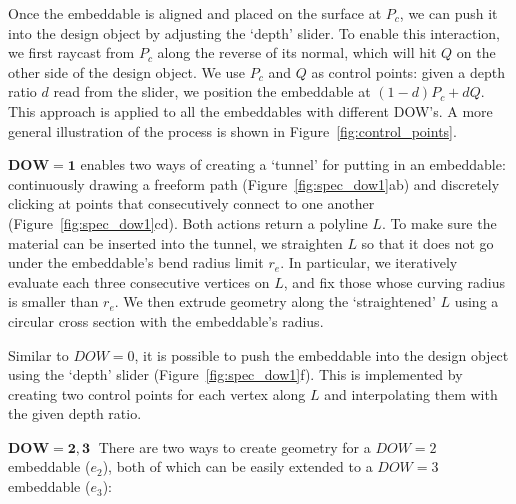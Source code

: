 Once the embeddable is aligned and placed on the surface at $P_c$, we can push it into the design object by adjusting the `depth' slider. To enable this interaction, we first raycast from $P_c$ along the reverse of its normal, which will hit $Q$ on the other side of the design object. We use $P_c$ and $Q$ as control points: given a depth ratio $d$ read from the slider, we position the embeddable at $(1-d)P_c + dQ$. This approach is applied to all the embeddables with different DOW's. A more general illustration of the process is shown in Figure~\ref{fig:control_points}.

$\mathbf{DOW=1}$ enables two ways of creating a `tunnel' for putting in an embeddable: continuously drawing a freeform path (Figure~\ref{fig:spec_dow1}ab) and discretely clicking at points that consecutively connect to one another (Figure~\ref{fig:spec_dow1}cd). Both actions return a polyline $L$. To make sure the material can be inserted into the tunnel, we straighten $L$ so that it does not go under the embeddable's bend radius limit $r_e$. In particular, we iteratively evaluate each three consecutive vertices on $L$, and fix those whose curving radius is smaller than $r_e$. We then extrude geometry along the `straightened' $L$ using a circular cross section with the embeddable's radius.

Similar to $DOW=0$, it is possible to push the embeddable into the design object using the `depth' slider (Figure~\ref{fig:spec_dow1}f). This is implemented by creating two control points for each vertex along $L$ and interpolating them with the given depth ratio.


$\mathbf{DOW=2, 3} \;$ There are two ways to create geometry for a $DOW=2$ embeddable ($e_2$), both of which can be easily extended to a $DOW=3$ embeddable ($e_3$): 

